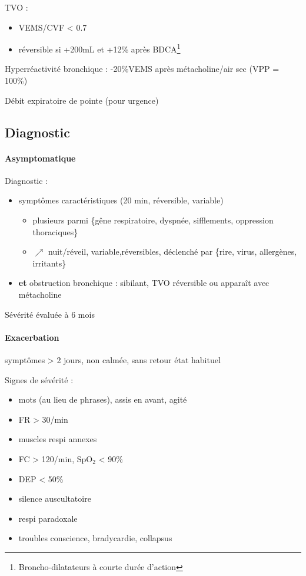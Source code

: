 \documentclass{article}
\begin{document}
TVO : 
\begin{itemize}
\item \gls{VEMS}/CVF < 0.7
\item réversible si +200mL et +12\% après BDCA\footnote{Broncho-dilatateurs à courte durée
    d'action}
\end{itemize}

Hyperréactivité bronchique : -20\%VEMS après métacholine/air sec (VPP = 100\%)

Débit expiratoire de pointe (pour urgence)

\subsection{Diagnostic}
\paragraph{Asymptomatique}
Diagnostic :
\begin{itemize}
\item symptômes caractéristiques (20 min, réversible, variable)
  \begin{itemize}
    \item plusieurs parmi \{gêne respiratoire, dyspnée,
        sifflements, oppression thoraciques\}
    \item $\nearrow$ nuit/réveil, variable,réversibles, déclenché par \{rire,
      virus, allergènes, irritants\}
    \end{itemize}
\item \textbf{et} obstruction bronchique : sibilant, TVO réversible ou apparaît avec métacholine
\end{itemize}
Sévérité évaluée à 6 mois
\paragraph{Exacerbation}
\nearrow{} symptômes > 2 jours, non calmée, sans retour état habituel

Signes de sévérité :
\begin{itemize}
\item mots (au lieu de phrases), assis en avant, agité
\item FR > 30/min
\item muscles respi annexes
\item FC > 120/min, SpO\(_{\text{2}}\) < 90\%
\item DEP < 50\%
\item silence auscultatoire \skull
\item respi paradoxale \skull
\item troubles conscience, bradycardie, collapsus \skull
\end{itemize}
\end{document}
